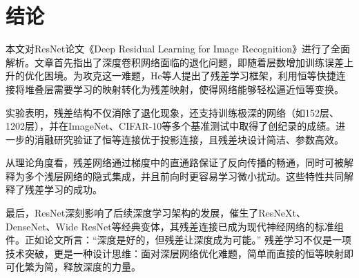 \section{结论}

本文对ResNet论文《Deep Residual Learning for Image Recognition》进行了全面解析。文章首先指出了深度卷积网络面临的退化问题，即随着层数增加训练误差上升的优化困境。为攻克这一难题，He等人提出了残差学习框架，利用恒等快捷连接将堆叠层需要学习的映射转化为残差映射，使得网络能够轻松逼近恒等变换。

实验表明，残差结构不仅消除了退化现象，还支持训练极深的网络（如152层、1202层），并在ImageNet、CIFAR-10等多个基准测试中取得了创纪录的成绩。进一步的消融研究验证了恒等连接优于投影连接，且残差块设计简洁、参数高效。

从理论角度看，残差网络通过梯度中的直通路保证了反向传播的畅通，同时可被解释为多个浅层网络的隐式集成，并且前向时更容易学习微小扰动。这些特性共同解释了残差学习的成功。

最后，ResNet深刻影响了后续深度学习架构的发展，催生了ResNeXt、DenseNet、Wide ResNet等经典变体，其残差连接已成为现代神经网络的标准组件。正如论文所言：“深度是好的，但残差让深度成为可能。” 残差学习不仅是一项技术突破，更是一种设计思维：面对深层网络优化难题，简单而直接的恒等映射即可化繁为简，释放深度的力量。